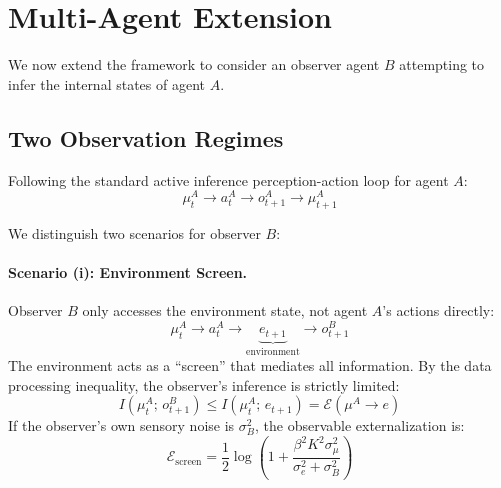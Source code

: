 \documentclass[runningheads]{llncs}
\begin{document}
\section{Multi-Agent Extension}
\label{sec:multi_agent}

We now extend the framework to consider an observer agent $B$ attempting to infer the internal states of agent $A$.

\subsection{Two Observation Regimes}

Following the standard active inference perception-action loop for agent $A$:
\begin{equation}
    \mu_t^A \to a_t^A \to o_{t+1}^A \to \mu_{t+1}^A
    \label{eq:agent_loop}
\end{equation}

We distinguish two scenarios for observer $B$:

\paragraph{Scenario (i): Environment Screen.}
Observer $B$ only accesses the environment state, not agent $A$'s actions directly:
\begin{equation}
    \mu_t^A \to a_t^A \to \underbrace{e_{t+1}}_{\text{environment}} \to o_{t+1}^B
    \label{eq:screen}
\end{equation}
The environment acts as a ``screen'' that mediates all information. By the data processing inequality, the observer's inference is strictly limited:
\begin{equation}
    I(\mu_t^A; \, o_{t+1}^B) \leq I(\mu_t^A; \, e_{t+1}) = \mathcal{E}(\mu^A \to e)
    \label{eq:screen_bound}
\end{equation}
If the observer's own sensory noise is $\sigma_B^2$, the observable externalization is:
\begin{equation}
    \mathcal{E}_{\text{screen}} = \frac{1}{2} \log \left( 1 + \frac{\beta^2 K^2 \sigma_\mu^2}{\sigma_e^2 + \sigma_B^2} \right)
    \label{eq:screen_externalization}
\end{equation}
\end{document}
